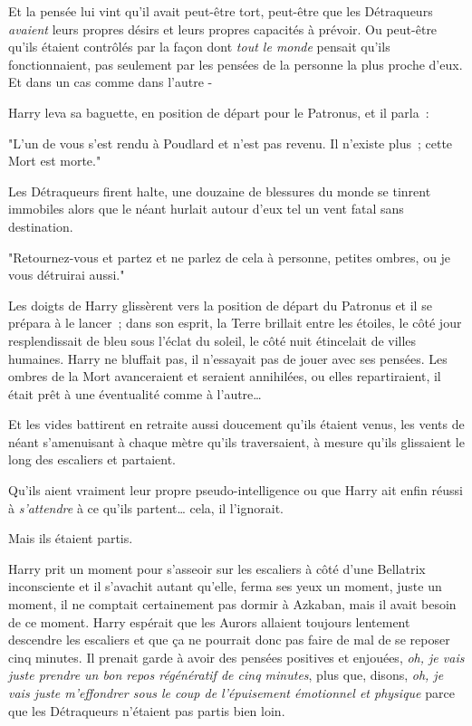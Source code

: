 Et la pensée lui vint qu'il avait peut-être tort, peut-être que les Détraqueurs \emph{avaient} leurs propres désirs et leurs propres capacités à prévoir. Ou peut-être qu'ils étaient contrôlés par la façon dont \emph{tout le monde} pensait qu'ils fonctionnaient, pas seulement par les pensées de la personne la plus proche d'eux. Et dans un cas comme dans l'autre -

Harry leva sa baguette, en position de départ pour le Patronus, et il parla~:

"L'un de vous s'est rendu à Poudlard et n'est pas revenu. Il n'existe plus~; cette Mort est morte."

Les Détraqueurs firent halte, une douzaine de blessures du monde se tinrent immobiles alors que le néant hurlait autour d'eux tel un vent fatal sans destination.

"Retournez-vous et partez et ne parlez de cela à personne, petites ombres, ou je vous détruirai aussi."

Les doigts de Harry glissèrent vers la position de départ du Patronus et il se prépara à le lancer~; dans son esprit, la Terre brillait entre les étoiles, le côté jour resplendissait de bleu sous l'éclat du soleil, le côté nuit étincelait de villes humaines. Harry ne bluffait pas, il n'essayait pas de jouer avec ses pensées. Les ombres de la Mort avanceraient et seraient annihilées, ou elles repartiraient, il était prêt à une éventualité comme à l'autre…

Et les vides battirent en retraite aussi doucement qu'ils étaient venus, les vents de néant s'amenuisant à chaque mètre qu'ils traversaient, à mesure qu'ils glissaient le long des escaliers et partaient.

Qu'ils aient vraiment leur propre pseudo-intelligence ou que Harry ait enfin réussi à \emph{s'attendre} à ce qu'ils partent… cela, il l'ignorait.

Mais ils étaient partis.

Harry prit un moment pour s'asseoir sur les escaliers à côté d'une Bellatrix inconsciente et il s'avachit autant qu'elle, ferma ses yeux un moment, juste un moment, il ne comptait certainement pas dormir à Azkaban, mais il avait besoin de ce moment. Harry espérait que les Aurors allaient toujours lentement descendre les escaliers et que ça ne pourrait donc pas faire de mal de se reposer cinq minutes. Il prenait garde à avoir des pensées positives et enjouées, \emph{oh, je vais juste prendre un bon repos régénératif de cinq minutes}, plus que, disons, \emph{oh, je vais juste m'effondrer sous le coup de l'épuisement émotionnel et physique} parce que les Détraqueurs n'étaient pas partis bien loin.

